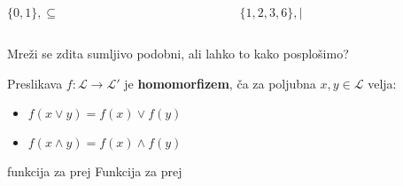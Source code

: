 \documentclass{beamer}
\begin{document}
\begin{frame}
\begin{columns}
\begin{column}{5cm}
\begin{center}
$\{0,1\}, \subseteq$
\end{center}
\begin{figure}
\centering
{}
\end{figure}
\end{column}

\begin{column}{5cm}
\begin{center}
$\{1,2,3,6\}, |$
\end{center}
\begin{figure}
\centering
{}
\end{figure}
\end{column}
\end{columns}

\begin{block}{}
Mreži se zdita sumljivo podobni, ali lahko to kako posplošimo?
\end{block}

\end{frame}

\begin{frame}
\begin{definition}
Preslikava $f :\mathcal{L} \to \mathcal{L}'$ je \textbf{homomorfizem}, ča za poljubna $x,y \in \mathcal{L}$ velja:
\begin{itemize}
\item $f(x \lor y) = f(x) \lor f(y)$
\item $f(x \land y) = f(x) \land f(y)$
\end{itemize}
\end{definition}



\begin{block}{funkcija za prej}
Funkcija za prej
\end{block}

\end{frame}
\end{document}

